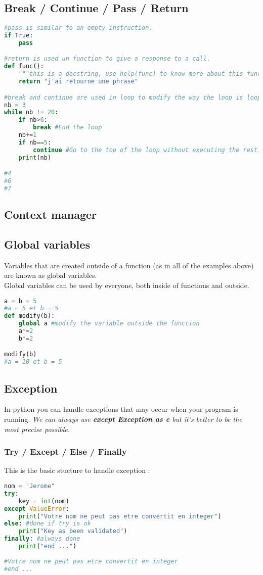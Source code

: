 \documentclass[a4paper, 12pt]{article}
\begin{document}
\subsection{Break / Continue / Pass / Return}
\label{subsec:BCPR}
\begin{lstlisting}[language=Python]
#pass is similar to an empty instruction.
if True:
    pass

#return is used un function to give a response to a call.
def func():
	"""this is a docstring, use help(func) to know more about this function."""
	return "j'ai retourne une phrase"

#break and continue are used in loop to modify the way the loop is looping.
nb = 3
while nb != 20:
	if nb>6:
		break #End the loop
	nb+=1
	if nb==5:
		continue #Go to the top of the loop without executing the rest.	
	print(nb)

#4
#6
#7
\end{lstlisting}

\subsection{Context manager}
\label{subsec:ContextManager}

\subsection{Global variables}
\label{subsec:Global}
Variables that are created outside of a function (as in all of the examples above) are known as global variables.\\
Global variables can be used by everyone, both inside of functions and outside.
\begin{lstlisting}[language=Python]
a = b = 5
#a = 5 et b = 5
def modify(b):
	global a #modify the variable outside the function
	a*=2
	b*=2

modify(b)
#a = 10 et b = 5
\end{lstlisting}

\subsection{Exception}
In python you can handle exceptions that may occur when your program is running. \textit{We can always use \textbf{except Exception as e} but it's better to be the most precise possible.}
\subsubsection{Try / Except / Else / Finally}
This is the basic stucture to handle exception :
\label{TEEF}
\begin{lstlisting}[language=Python]
nom = "Jerome"
try:
	key = int(nom)
except ValueError:
	print("Votre nom ne peut pas etre convertit en integer")
else: #done if try is ok
	print("Key as been validated")
finally: #always done
	print("end ...")
	
#Votre nom ne peut pas etre convertit en integer
#end ...
\end{lstlisting}
\end{document}
